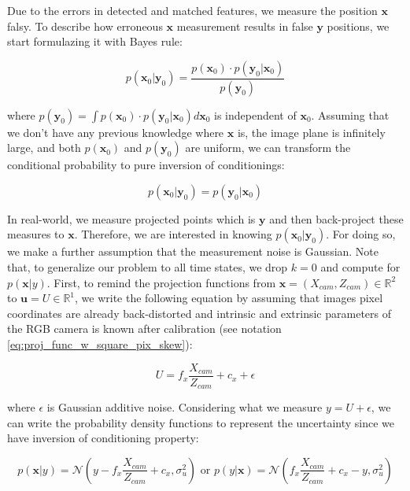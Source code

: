 \documentclass[a4paper]{report}
\numberwithin{figure}{section}
\newcommand{\R}{\mathbb{R}}
\begin{document}
Due to the errors in detected and matched features, 
we measure the position $\mathbf{x}$ falsy. To describe how erroneous $\mathbf{x}$ 
measurement results in false $\mathbf{y}$ positions, 
we start formulazing it with Bayes rule:

\begin{equation}
  p(\mathbf{x}_0|\mathbf{y}_0) = \frac{p(\mathbf{x}_0) \cdot p(\mathbf{y}_0|\mathbf{x}_0)}{p(\mathbf{y}_0)}
\end{equation}

where $p(\mathbf{y}_0) = \int p(\mathbf{x}_0) \cdot p(\mathbf{y}_0|\mathbf{x}_0) d\mathbf{x}_0$
is independent of $\mathbf{x}_0$. Assuming that we don't have any previous 
knowledge where $\mathbf{x}$ is, the image plane is infinitely 
large, and both $p(\mathbf{x}_0)$ and $p(\mathbf{y}_0)$ are uniform, we can transform 
the conditional probability to pure inversion of conditionings:

\begin{equation}
  p(\mathbf{x}_0|\mathbf{y}_0) = p(\mathbf{y}_0|\mathbf{x}_0)
\end{equation}

In real-world, we measure projected points which is $\mathbf{y}$ and then 
back-project these measures to $\mathbf{x}$. Therefore, we are interested in 
knowing $p(\mathbf{x}_0|\mathbf{y}_0)$. For doing so, we make a further 
assumption that the measurement noise is Gaussian. Note that, to generalize our 
problem to all time states, we drop $k=0$ and compute for $p(\mathbf{x}|y)$. 
First, to remind the projection functions from $\mathbf{x}=(X_{cam},Z_{cam}) \in \R^2$ to 
$\mathbf{u}=U \in \R^1$, we write the following equation by assuming that 
images pixel coordinates are already back-distorted and 
intrinsic and extrinsic parameters of the RGB camera is known after calibration
(see notation \ref{eq:proj_func_w_square_pix_skew}):

\begin{equation}
  U = f_x \frac{X_{cam}}{Z_{cam}} + c_x + \epsilon
\end{equation}

where $\epsilon$ is Gaussian additive noise. Considering what we measure 
$y=U+\epsilon$, we can write the probability density functions
to represent the uncertainty since we have inversion of conditioning property:

\begin{equation}
  p(\mathbf{x}|y) = \mathcal{N}(y-f_x \frac{X_{cam}}{Z_{cam}} + c_x, \sigma_u^2) \text{ or }
  p(y|\mathbf{x}) = \mathcal{N}(f_x \frac{X_{cam}}{Z_{cam}} + c_x-y, \sigma_u^2)
\end{equation}
\end{document}
